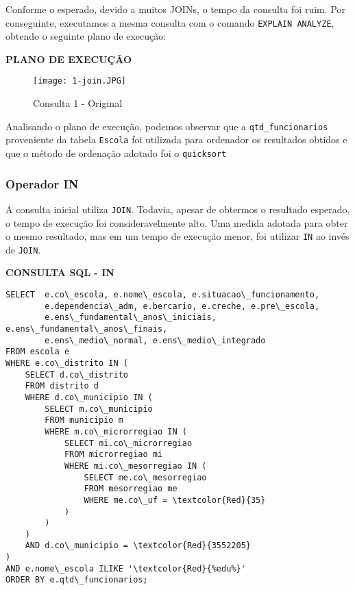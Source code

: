 \documentclass[12pt,a4paper]{article}
\begin{document}
Conforme o esperado, devido a muitos JOINs, o tempo da consulta foi ruim. Por conseguinte, executamos a mesma consulta com o comando \texttt{EXPLAIN ANALYZE}, obtendo o seguinte plano de execução:


\begin{flushleft}
\textbf{PLANO DE EXECUÇÃO}\\
\end{flushleft}

\begin{figure}[H]
    \centering
    \texttt{[image: 1-join.JPG]}
    \caption{Consulta 1 - Original}
    \label{fig:diagrama}
\end{figure}


Analisando o plano de execução, podemos observar que a \texttt{qtd\_funcionarios} proveniente da tabela \texttt{Escola} foi utilizada para ordenador os resultados obtidos e que o método de ordenação adotado foi o \texttt{quicksort} 


\subsubsection{Operador IN}

A consulta inicial utiliza \texttt{JOIN}. Todavia, apesar de obtermos o resultado esperado, o tempo de execução foi consideravelmente alto. Uma medida adotada para obter o mesmo resultado, mas em um tempo de execução menor, foi utilizar \texttt{IN} ao invés de \texttt{JOIN}. 

\vspace{0.5cm}

\begin{flushleft}
\textbf{CONSULTA SQL - IN}\\
\end{flushleft}

\begin{Verbatim}[commandchars=\\\{\}]
SELECT  e.co\_escola, e.nome\_escola, e.situacao\_funcionamento, 
        e.dependencia\_adm, e.bercario, e.creche, e.pre\_escola,
        e.ens\_fundamental\_anos\_iniciais, e.ens\_fundamental\_anos\_finais,
        e.ens\_medio\_normal, e.ens\_medio\_integrado
FROM escola e
WHERE e.co\_distrito IN (
    SELECT d.co\_distrito
    FROM distrito d
    WHERE d.co\_municipio IN (
        SELECT m.co\_municipio
        FROM municipio m
        WHERE m.co\_microrregiao IN (
            SELECT mi.co\_microrregiao
            FROM microrregiao mi
            WHERE mi.co\_mesorregiao IN (
                SELECT me.co\_mesorregiao
                FROM mesorregiao me
                WHERE me.co\_uf = \textcolor{Red}{35}
            )
        )
    )
    AND d.co\_municipio = \textcolor{Red}{3552205}
)
AND e.nome\_escola ILIKE '\textcolor{Red}{%edu%}'
ORDER BY e.qtd\_funcionarios;
\end{Verbatim}
\end{document}
